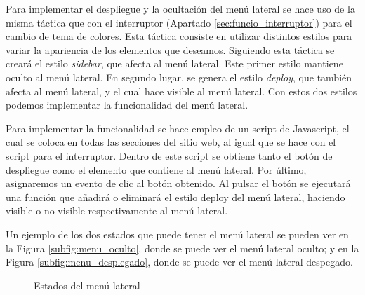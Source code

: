 Para implementar el despliegue y la ocultación del menú lateral se hace uso de la misma táctica que con el interruptor (Apartado \ref{sec:funcio_interruptor}) para el cambio de tema de colores. Esta táctica consiste en utilizar distintos estilos para variar la apariencia de los elementos que deseamos. Siguiendo esta táctica se creará el estilo \textit{sidebar}, que afecta al menú lateral. Este primer estilo mantiene oculto al menú lateral. En segundo lugar, se genera el estilo \textit{deploy}, que también afecta al menú lateral, y el cual hace visible al menú lateral. Con estos dos estilos podemos implementar la funcionalidad del menú lateral.

Para implementar la funcionalidad se hace empleo de un script de Javascript, el cual se coloca en todas las secciones del sitio web, al igual que se hace con el script para el interruptor. Dentro de este script se obtiene tanto el botón de despliegue como el elemento que contiene al menú lateral. Por último, asignaremos un evento de clic al botón obtenido. Al pulsar el botón se ejecutará una función que añadirá o eliminará el estilo deploy del menú lateral, haciendo visible o no visible respectivamente al menú lateral.

Un ejemplo de los dos estados que puede tener el menú lateral se pueden ver en la Figura \ref{subfig:menu_oculto}, donde se puede ver el menú lateral oculto; y en la Figura \ref{subfig:menu_desplegado}, donde se puede ver el menú lateral despegado.

\begin{figure}[h]
\centering
{}
\caption{Estados del menú lateral}
\label{fig:estados_menu_lateral}
\end{figure}

